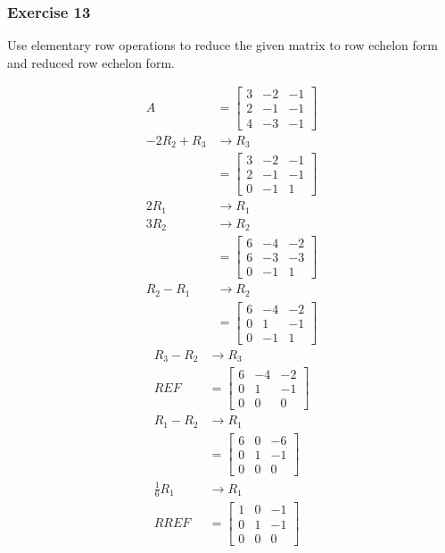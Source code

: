 \documentclass[letterpaper, 12pt]{math}
\begin{document}
\subsubsection*{Exercise 13}
Use elementary row operations to reduce the given matrix to row echelon form
and reduced row echelon form.
\begin{multicols}{2}
  \begin{align*}
    A &= \begin{bmatrix}
      3 & -2 & -1 \\
      2 & -1 & -1 \\
      4 & -3 & -1
    \end{bmatrix} \\
    -2R_2+R_3 &\to R_3 \\
    &= \begin{bmatrix}
      3 & -2 & -1 \\
      2 & -1 & -1 \\
      0 & -1 & 1
    \end{bmatrix} \\
    2R_1 &\to R_1 \\
    3R_2 &\to R_2 \\
    &= \begin{bmatrix}
      6 & -4 & -2 \\
      6 & -3 & -3 \\
      0 & -1 & 1
    \end{bmatrix} \\
    R_2-R_1 &\to R_2 \\
    &= \begin{bmatrix}
      6 & -4 & -2 \\
      0 & 1 & -1 \\
      0 & -1 & 1
    \end{bmatrix}
  \end{align*}\break
  \begin{align*}
    R_3-R_2 &\to R_3 \\
    REF &= \begin{bmatrix}
      6 & -4 & -2 \\
      0 & 1 & -1 \\
      0 & 0 & 0
    \end{bmatrix} \\
    R_1-R_2 &\to R_1 \\
    &= \begin{bmatrix}
      6 & 0 & -6 \\
      0 & 1 & -1 \\
      0 & 0 & 0
    \end{bmatrix} \\
    \frac{1}{6}R_1 &\to R_1 \\
    RREF &= \begin{bmatrix}
      1 & 0 & -1 \\
      0 & 1 & -1 \\
      0 & 0 & 0
    \end{bmatrix}
  \end{align*}
\end{multicols}
\end{document}

